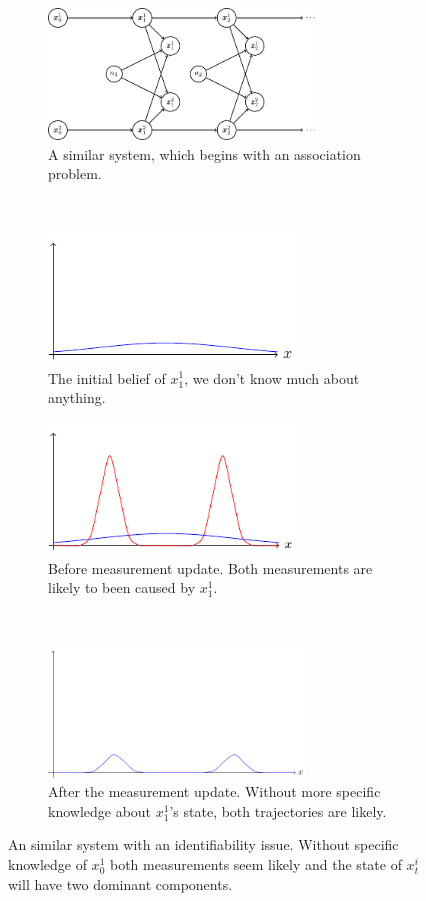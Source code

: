 \begin{figure}
    \centering
    \begin{subfigure}[t]{0.5\textwidth}
        \centering
        \includegraphics[height=3.5cm]{tikz/bayes_symmetrical}
        \caption{A similar system, which begins with an association problem.}
    \end{subfigure}%
  	~
    \centering
    \begin{subfigure}[t]{0.5\textwidth}
        \centering
        \includegraphics[height=3.5cm]{tikz/prior}
        \caption{The initial belief of $x_{1}^{1}$, we don't know much about anything.}
    \end{subfigure}%
    
    \begin{subfigure}[t]{0.5\textwidth}
        \centering
        \includegraphics[height=3.5cm]{tikz/gaussian_mixture}
        \caption{Before measurement update. Both measurements are likely to been caused by $x_1^1$.}
    \end{subfigure}%
    ~
    \centering
    \begin{subfigure}[t]{0.5\textwidth}
        \centering
        \includegraphics[height=3.5cm]{tikz/product_mixture}
        \caption{After the measurement update. Without more specific knowledge about  $x_1^{1}$'s  state, both trajectories are likely.}
    \end{subfigure}%
    \caption{An similar system with an identifiability issue. Without specific knowledge of $x_0^1$ both measurements seem likely and the state of $x_{t}^{i}$ will have two dominant components.}
    \label{figure:indentity_issue}
\end{figure}